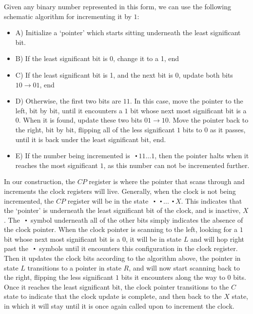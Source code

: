 \documentclass[11pt,letterpaper]{article}
\newcommand{\<}{\langle}
\renewcommand{\>}{\rangle}
\newcommand{\bul}{\:\:\centerdot\:}       %
\begin{document}
Given any binary number represented in this form, we can use the following schematic algorithm for incrementing it by $1$:
\begin{itemize}
	\item A) Initialize a `pointer' which starts sitting underneath the least significant bit.
	\item B) If the least significant bit is 0, change it to a 1, end
	\item C) If the least significant bit is 1, and the next bit is 0, update both bits $10\to01$, end
	\item D) Otherwise, the first two bits are $11$. In this case, move the pointer to the left, bit by bit, until it encounters a $1$ bit whose next most significant bit is a $0$. When it is found, update these two bits $01\to10$. Move the pointer back to the right, bit by bit, flipping all of the less significant $1$ bits to $0$ as it passes, until it is back under the least significant bit, end.
	\item E) If the number being incremented is $\bul 11... 1$, then the pointer halts when it reaches the most significant $1$, as this number can not be incremented further.
\end{itemize}
In our construction, the $CP$ register is where the pointer that scans through and increments the clock registers will live. Generally, when the clock is not being incremented, the $CP$ register will be in the state $\bul\bul...\bul X$. This indicates that the `pointer' is underneath the least significant bit of the clock, and is inactive, $X$. The $\bul$ symbol underneath all of the other bits simply indicates the absence of the clock pointer. When the clock pointer is scanning to the left, looking for a $1$ bit whose next most significant bit is a $0$, it will be in state $L$ and will hop right past the $\bul$ symbols until it encounters this configuration in the clock register. Then it updates the clock bits according to the algorithm above, the pointer in state $L$ transitions to a pointer in state $R$, and will now start scanning back to the right, flipping the less significant $1$ bits it encounters along the way to $0$ bits. Once it reaches the least significant bit, the clock pointer transitions to the $C$ state to indicate that the clock update is complete, and then back to the $X$ state, in which it will stay until it is once again called upon to increment the clock. 
\end{document}
